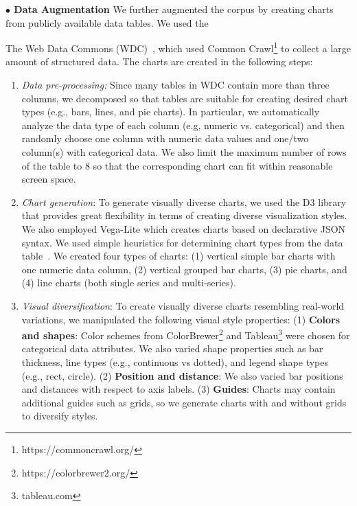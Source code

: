\textbf{$\bullet$ Data Augmentation} We further augmented the corpus by creating charts from publicly available data tables. We used the {The Web Data Commons 
 (WDC)~\cite{webdatacommons}, which used Common Crawl\footnote{https://commoncrawl.org/} to collect a large amount of structured data. 
The charts are created in the following steps: 

\begin{enumerate} [wide, label=(\roman*),labelwidth=!, itemindent=!, labelindent=0pt]
\vspace{-2mm}
    \item \textit{Data pre-processing:} Since many tables in WDC contain more than three columns, we decomposed so that tables are suitable for creating desired chart types (e.g., bars, lines, and pie charts). In particular, we automatically analyze the data type of each column (e.g, numeric vs. categorical) and then randomly choose one column with numeric data values and one/two column(s) with categorical data. We also limit the maximum number of rows of the table to 8 so that the corresponding chart can fit within reasonable screen space. 
\vspace{-2mm}

    \item \textit{Chart generation}: To generate visually diverse charts, we used the D3 \cite{d3} library that provides great flexibility in terms of creating diverse visualization styles. We also employed Vega-Lite \cite{vegalite} which creates charts based on declarative JSON syntax. We used simple heuristics for determining chart types from the data table~\cite{mackinlay2007show}. We created four types of charts: (1) vertical simple bar charts with one numeric data column, (2) vertical grouped bar charts, (3) pie charts, and (4) line charts (both single series and multi-series).
\vspace{-2mm}
    \item  \textit{Visual diversification}: To create visually diverse charts resembling real-world variations, we  manipulated the following visual style properties: (1) \textbf{Colors and shapes}: Color schemes from ColorBrewer\footnote{https://colorbrewer2.org/} and Tableau\footnote{tableau.com} were chosen for categorical data attributes. We also varied shape properties such as bar thickness, line types (e.g., continuous vs dotted), and legend shape types (e.g., rect, circle). (2) \textbf{Position and distance}: We also varied bar positions and distances with respect to axis labels. (3) \textbf{Guides}: Charts may contain additional guides such as grids, so we generate charts with and without grids to diversify styles. 
\end{enumerate}

}

